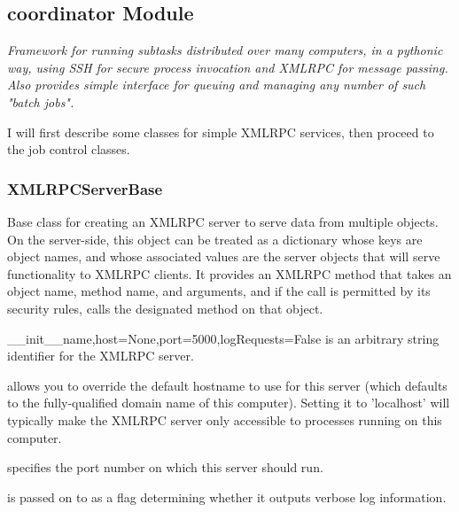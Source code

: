 \documentclass{howto}
\begin{document}
\subsection{coordinator Module}
\label{coord-module}

{\em Framework for running subtasks distributed over many computers, in a pythonic way, using SSH for secure process invocation and XMLRPC for message passing. Also provides simple interface for queuing and managing any number of such "batch jobs".}

I will first describe some classes for simple XMLRPC services, then proceed
to the job control classes.

\subsubsection{XMLRPCServerBase}
Base class for creating an XMLRPC server to serve data from multiple objects.
On the server-side, this object can be treated as a dictionary whose
keys are object names, and whose associated values are the server
objects that will serve functionality to XMLRPC clients.
It provides an XMLRPC method  that takes an object name,
method name, and arguments, and if the call is permitted by its security
rules, calls the designated method on that object.
\begin{funcdesc}{__init__}{name,host=None,port=5000,logRequests=False}
   is an arbitrary string identifier for the XMLRPC server.

   allows you to override the default hostname to use for this
  server (which defaults to the fully-qualified domain name of this computer).
  Setting it to 'localhost' will typically make the XMLRPC server only accessible
  to processes running on this computer.

   specifies the port number on which this server should run.

   is passed on to  as
  a flag determining whether it outputs verbose log information.
\end{funcdesc}
\end{document}
